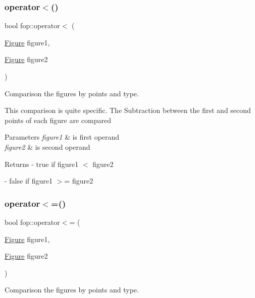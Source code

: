 \subsubsection{\texorpdfstring{operator$<$()}{operator<()}}
{\footnotesize\ttfamily bool fop\+::operator$<$ (\begin{DoxyParamCaption}\item[{\mbox{\hyperlink{classfop_1_1_figure}{Figure}}}]{figure1,  }\item[{\mbox{\hyperlink{classfop_1_1_figure}{Figure}}}]{figure2 }\end{DoxyParamCaption})}



Comparison the figures by points and type. 

This comparison is quite specific. The Subtraction between the first and second points of each figure are compared 
\begin{DoxyParams}{Parameters}
{\em figure1} & is first operand \\
\hline
{\em figure2} & is second operand \\
\hline
\end{DoxyParams}
\begin{DoxyReturn}{Returns}
-\/ true if \textquotesingle{}figure1\textquotesingle{} $<$ \textquotesingle{}figure2\textquotesingle{} 

-\/ false if \textquotesingle{}figure1\textquotesingle{} $>$= \textquotesingle{}figure2\textquotesingle{} 
\end{DoxyReturn}
\mbox{\label{namespacefop_a2315668c95e8c527cc00fa12d792542c}} 
\subsubsection{\texorpdfstring{operator$<$=()}{operator<=()}}
{\footnotesize\ttfamily bool fop\+::operator$<$= (\begin{DoxyParamCaption}\item[{\mbox{\hyperlink{classfop_1_1_figure}{Figure}}}]{figure1,  }\item[{\mbox{\hyperlink{classfop_1_1_figure}{Figure}}}]{figure2 }\end{DoxyParamCaption})}



Comparison the figures by points and type. 

